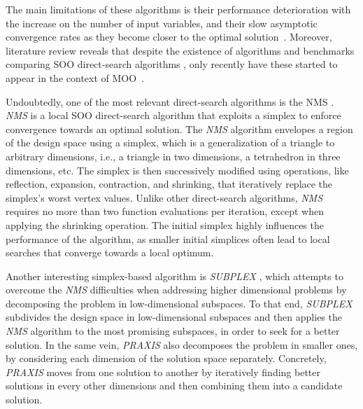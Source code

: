	The main limitations of these algorithms is their performance deterioration with the increase on the number of input variables, and their slow asymptotic convergence rates as they become closer to the optimal solution~\cite{Kolda2003}. Moreover, literature review reveals that despite the existence of algorithms and benchmarks comparing \ac{SOO} direct-search algorithms \cite{Waibel2018}, only recently have these started to appear in the context of \ac{MOO}~\cite{Custodio2010,Custodio2018}. 
	
	Undoubtedly, one of the most relevant direct-search algorithms is the \ac{NMS} \cite{Nelder1964}. \textit{\ac{NMS}} is a local \ac{SOO} direct-search algorithm that exploits a simplex to enforce convergence towards an optimal solution. The \textit{\ac{NMS}} algorithm envelopes a region of the design space using a simplex, which is a generalization of a triangle to arbitrary dimensions, i.e., a triangle in two dimensions, a tetrahedron in three dimensions, etc. The simplex is then successively modified using operations, like reflection, expansion, contraction, and shrinking, that iteratively replace the simplex's worst vertex values. %
	Unlike other direct-search algorithms, \textit{\ac{NMS}} requires no more than two function evaluations per iteration, except when applying the shrinking operation. The initial simplex highly influences the performance of the algorithm, as smaller initial simplices often lead to local searches that converge towards a local optimum.
	
	Another interesting simplex-based algorithm is \textit{SUBPLEX} \cite{Rowan1990}, which attempts to overcome the \textit{\ac{NMS}} difficulties when addressing higher dimensional problems by decomposing the problem in low-dimensional subspaces. To that end, \textit{SUBPLEX} subdivides the design space in low-dimensional subspaces and then applies the \textit{\ac{NMS}} algorithm to the most promising subspaces, in order to seek for a better solution. %
	In the same vein, \textit{\ac{PRAXIS}} \cite{Brent1973} also decomposes the problem in smaller ones, by considering each dimension of the solution space separately. Concretely, \textit{\ac{PRAXIS}} moves from one solution to another by iteratively finding better solutions in every other dimensions and then combining them into a candidate solution. 
	
